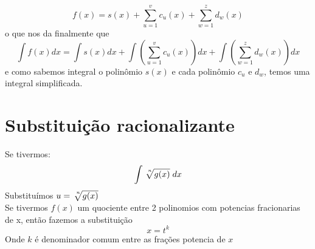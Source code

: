 \begin{equation}
    f(x) = 
        s(x) + 
        \sum_{u = 1}^{v} 
            c_u(x) + 
        \sum_{w = 1}^{z} 
            d_w(x)
\end{equation}
o que nos da finalmente que
\begin{equation}
    \int f(x) dx = 
        \int s(x)dx + 
        \int 
            \left(
                \sum_{u = 1}^{v} c_u(x)
            \right)
        dx
        + 
        \int 
            \left(
                \sum_{w = 1}^{z} d_w(x)
            \right)
        dx
\end{equation}
e como sabemos integral o polinômio \(s(x)\) e cada polinômio \(c_u\) e \(d_w\), temos uma integral simplificada.
\section{Substituição racionalizante}

Se tivermos:
\begin{equation}
    \int \sqrt[\leftroot{-3}\uproot{3}n]{g(x)}\; dx
\end{equation}
Substituímos \( u = \sqrt[\leftroot{-3}\uproot{3}n]{g(x)} \)
\\
Se tivermos \(f(x)\) um quociente entre 2 polinomios com potencias fracionarias de x, então fazemos a substituição 
\begin{equation}
    x = t^k
\end{equation} 
Onde \(k\) é denominador comum entre as frações potencia de \(x\)